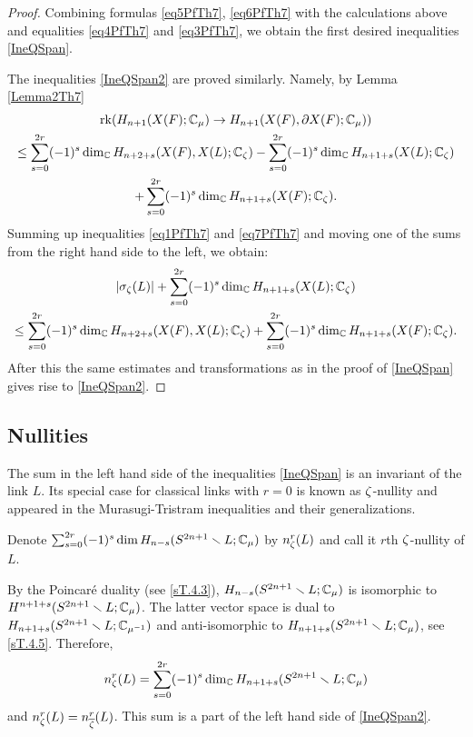 \documentclass{article}
\numberwithin{equation}{section}
\begin{document}
\begin{proof}
Combining formulas \eqref{eq5PfTh7}, \eqref{eq6PfTh7} with the calculations
above and equalities \eqref{eq4PfTh7} and \eqref{eq3PfTh7}, we obtain the
first desired inequalities \eqref{IneQSpan}.

The inequalities \eqref{IneQSpan2} are proved similarly. Namely,
by Lemma \ref{Lemma2Th7} 
\begin{multline}\label{eq7PfTh7}
\operatorname{rk}(H_{n+1}(X(F);\mathbb C_\mu)\to H_{n+1}(X(F),\partial X(F);\mathbb C_\mu))\\
\le \sum_{s=0}^{2r}(-1)^s\dim_\mathbb C H_{n+2+s}(X(F),X(L);\mathbb C_\zeta)
-\sum_{s=0}^{2r}(-1)^s\dim_\mathbb C H_{n+1+s}(X(L);\mathbb C_\zeta)\\
+\sum_{s=0}^{2r}(-1)^s\dim_\mathbb C H_{n+1+s}(X(F);\mathbb C_\zeta).
\end{multline}
Summing up inequalities \eqref{eq1PfTh7} and \eqref{eq7PfTh7} and 
moving one of the sums from the right
hand side to the left, we obtain:
\begin{multline}\label{eq8PfTh7}
|\sigma_\zeta(L)|+\sum_{s=0}^{2r}(-1)^s\dim_\mathbb C H_{n+1+s}(X(L);\mathbb C_\zeta)\\
\le \sum_{s=0}^{2r}(-1)^s\dim_\mathbb C H_{n+2+s}(X(F),X(L);\mathbb C_\zeta)
+\sum_{s=0}^{2r}(-1)^s\dim_\mathbb C H_{n+1+s}(X(F);\mathbb C_\zeta).
\end{multline}
After this the same estimates and transformations as in the proof of 
\eqref{IneQSpan} gives rise to \eqref{IneQSpan2}.
\end{proof}

\subsection{Nullities}\label{s4.4}

The sum in the left hand side of the inequalities \eqref{IneQSpan} is an
invariant of the link $L$. Its special case for classical links with $r=0$ 
is known as $\zeta$-nullity and appeared in the Murasugi-Tristram inequalities and their generalizations. 

Denote  $\sum_{s=0}^{2r}(-1)^s\dim
H_{n-s}(S^{2n+1}\smallsetminus L;\mathbb C_\mu)$ by  $n^r_{\zeta}(L)$ and call it 
{\sfit $r$th $\zeta$-nullity of $L$\/}.

By the Poincar\'{e} duality (see \ref{sT.4.3}), 
$H_{n-s}(S^{2n+1}\smallsetminus L;\mathbb C_\mu)$ is isomorphic to 
$H^{n+1+s}(S^{2n+1}\smallsetminus L;\mathbb C_\mu)$. The latter vector space 
is dual to $H_{n+1+s}(S^{2n+1}\smallsetminus L;\mathbb C_{\mu^{-1}})$ and anti-isomorphic
to  $H_{n+1+s}(S^{2n+1}\smallsetminus L;\mathbb C_{\mu})$, see \ref{sT.4.5}. 
Therefore,
\begin{equation}\label{null}
n^r_{\zeta}(L)=\sum_{s=0}^{2r}(-1)^s\dim_\mathbb C H_{n+1+s}(S^{2n+1}\smallsetminus
L;\mathbb C_\mu)
\end{equation}
and $n^r_\zeta(L)=n^r_{\overline{\zeta}}(L)$.
This sum is a part of the left hand side of \eqref{IneQSpan2}.
\end{document}

